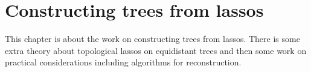 \chapter{Constructing trees from lassos}
\label{cha:lasso-construction}

This chapter is about the work on constructing trees from lassos.  There is
some extra theory about topological lassos on equidistant trees and then some
work on practical considerations including algorithms for reconstruction.


